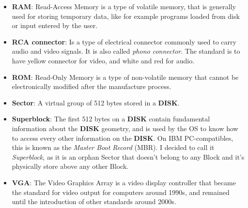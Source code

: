 \begin{itemize}
    \item \textbf{RAM}: Read-Access Memory is a type of volatile memory, that is
        generally used for storing temporary data, like for example programs
        loaded from disk or input entered by the user.
    \item \textbf{RCA connector}: Is a type of electrical connector commonly
        used to carry audio and video signals. It is also called
        \textit{phono connector}. The standard is to have yellow connector for
        video, and white and red for audio.
    \item \textbf{ROM}: Read-Only Memory is a type of non-volatile memory that 
        cannot be electronically modified after the manufacture process.
    \item \textbf{Sector}: A virtual group of 512 bytes stored in a
        \textbf{DISK}. 
    \item \textbf{Superblock}: The first 512 bytes on a \textbf{DISK} contain
        fundamental information about the \textbf{DISK} geometry, and is used by
        the OS to know how to access every other information on the
        \textbf{DISK}. On IBM PC-compatibles, this is known as the
        \textit{Master Boot Record} (MBR). I decided to call it
        \textit{Superblock}, as it is an orphan Sector that doesn't belong to
        any Block and it's physically store above any other Block.
    \item \textbf{VGA}: The Video Graphics Array is a video display controller
        that became the standard for video output for computers around 1990s,
        and remained until the introduction of other standards around 2000s.
\end{itemize}
